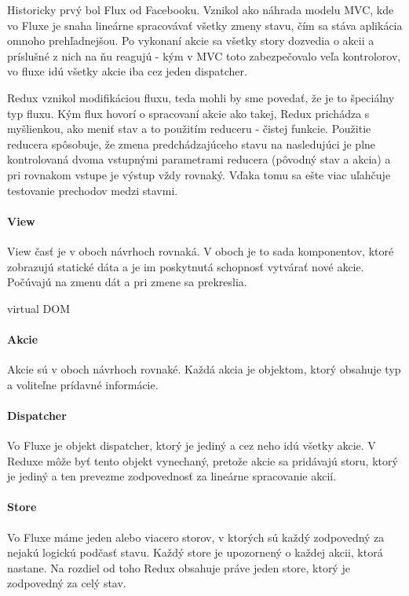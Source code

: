 Historicky prvý bol Flux od Facebooku. Vznikol ako náhrada modelu MVC, kde vo Fluxe je snaha lineárne spracovávať všetky zmeny stavu, čím sa stáva aplikácia omnoho prehľadnejšou. Po vykonaní akcie sa všetky story dozvedia o akcii a príslušné z nich na ňu reagujú - kým v MVC toto zabezpečovalo veľa kontrolorov, vo fluxe idú všetky akcie iba cez jeden dispatcher.

Redux vznikol modifikáciou fluxu, teda mohli by sme povedať, že je to špeciálny typ fluxu. Kým flux hovorí o spracovaní akcie ako takej, Redux prichádza s myšlienkou, ako meniť stav a to použitím reduceru - čistej funkcie. Použitie reducera spôsobuje, že zmena predchádzajúceho stavu na nasledujúci je plne kontrolovaná dvoma vstupnými parametrami reducera (pôvodný stav a akcia) a pri rovnakom vstupe je výstup vždy rovnaký. Vďaka tomu sa ešte viac uľahčuje testovanie prechodov medzi stavmi.

\paragraph{View}%
View časť je v oboch návrhoch rovnaká. V oboch je to sada komponentov, ktoré zobrazujú statické dáta a je im poskytnutá schopnosť vytvárať nové akcie. Počúvajú na zmenu dát a pri zmene sa prekreslia.

\TODO{} virtual DOM

\paragraph{Akcie}
Akcie sú v oboch návrhoch rovnaké. Každá akcia je objektom, ktorý obsahuje typ a voliteľne prídavné informácie.

\paragraph{Dispatcher}
Vo Fluxe je objekt dispatcher, ktorý je jediný a cez neho idú všetky akcie. V Reduxe môže byť tento objekt vynechaný, pretože akcie sa pridávajú storu, ktorý je jediný a ten prevezme zodpovednosť za lineárne spracovanie akcií.

\paragraph{Store}
Vo Fluxe máme jeden alebo viacero storov, v ktorých sú každý zodpovedný za nejakú logickú podčasť stavu. Každý store je upozornený o každej akcii, ktorá nastane. Na rozdiel od toho Redux obsahuje práve jeden store, ktorý je zodpovedný za celý stav.

